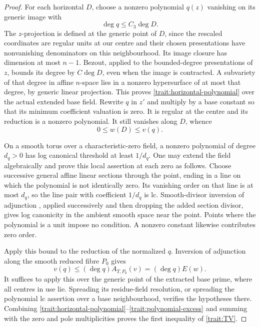 \begin{proof}
For each horizontal \(D\), choose a nonzero polynomial
\(q(z)\) vanishing on its generic image with
\begin{equation}
 \deg q\le C_3\deg D.
 \label{trait:horizontal-polynomial}
\end{equation}
The \(z\)-projection is defined at the generic point
of \(D\), since the rescaled coordinates are regular
units at our centre and their chosen presentations
have nonvanishing denominators on this neighbourhood.
Its image closure has dimension at most \(n-1\).
Bezout, applied to the bounded-degree presentations
of \(z\), bounds its degree by \(C\deg D\), even
when the image is contracted.  A subvariety of that
degree in affine \(n\)-space lies in a nonzero
hypersurface of at most that degree, by generic linear
projection.  This proves \eqref{trait:horizontal-polynomial}
over the actual extended base field.  Rewrite \(q\)
in \(z'\) and multiply by a base constant so that its
minimum coefficient valuation is zero.  It is regular
at the centre and its reduction is a nonzero polynomial.
It still vanishes along \(D\), whence
\begin{equation}
 0\le w(D)\le v(q).
 \label{trait:horizontal-order}
\end{equation}

On a smooth torus over a characteristic-zero field,
a nonzero polynomial of degree \(d_q>0\) has log
canonical threshold at least \(1/d_q\).  One may
extend the field algebraically and prove this local
assertion at each zero as follows.  Choose successive
general affine linear sections through the point,
ending in a line on which the polynomial is not
identically zero.  Its vanishing order on that line
is at most \(d_q\), so the line pair with coefficient
\(1/d_q\) is lc.  Smooth-divisor inversion of
adjunction \cite{KawakitaInversion}, applied successively
and then dropping the added section divisor, gives
log canonicity in the ambient smooth space near the
point.  Points where the polynomial is a unit impose
no condition.  A nonzero constant likewise contributes
zero order.

Apply this bound to the reduction of the normalized
\(q\).  Inversion of adjunction along the smooth
reduced fibre \(P_0\) gives
\begin{equation}
 v(q)\le(\deg q)A_{T,P_0}(v)
       =(\deg q)E(w).
 \label{trait:polynomial-excess}
\end{equation}
It suffices to apply this over the generic point of
the extracted base prime, where all centres in use
lie.  Spreading its residue-field resolution, or
spreading the polynomial lc assertion over a base
neighbourhood, verifies the hypotheses there.
Combining \eqref{trait:horizontal-polynomial}--\eqref{trait:polynomial-excess}
and summing with the zero and pole multiplicities
proves the first inequality of \eqref{trait:TV}.


\end{proof}
